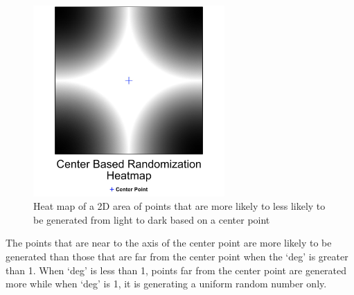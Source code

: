 \begin{figure}[ht]
\begin{center}
\includegraphics[width=0.65\textwidth]{img/cbr-map}
\caption{Heat map of a 2D area of points that are more likely to less likely to be generated from light to dark based on a center point}
\end{center}
\end{figure}

\par The points that are near to the axis of the center point are more likely to be generated than those that are far from the center point when the `deg' is greater than 1. When `deg' is less than 1, points far from the center point are generated more while when `deg' is 1, it is generating a uniform random number only.

